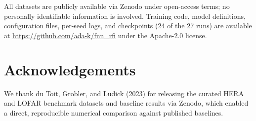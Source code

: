\documentclass[11pt]{article}
\begin{document}
All datasets are publicly available via Zenodo \citep{dutoit2023} under open-access terms; no personally identifiable information is involved. Training code, model definitions, configuration files, per-seed logs, and checkpoints (24 of the 27 runs) are available at \url{https://github.com/ada-k/fnn_rfi} under the Apache-2.0 license.

\section*{Acknowledgements}

We thank du Toit, Grobler, and Ludick (2023) for releasing the curated HERA and LOFAR benchmark datasets and baseline results via Zenodo, which enabled a direct, reproducible numerical comparison against published baselines.
\end{document}
